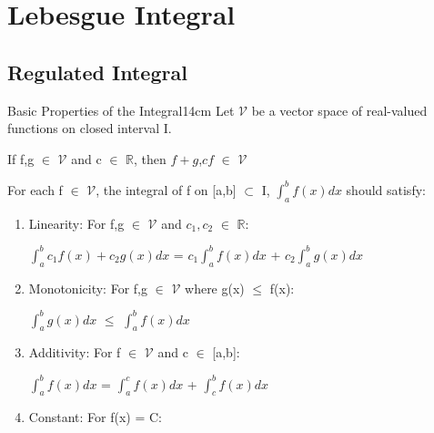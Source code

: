 \newpage

\section[Day 17: Lebesgue Integral]{ Lebesgue Integral }

\subsection{ Regulated Integral }

    \begin{definition}{Basic Properties of the Integral}{14cm}
        Let $\mathcal{V}$ be a vector space of real-valued functions
        on closed interval I.

        \hspace{0.5cm}
        If f,g $\in$ $\mathcal{V}$ and c $\in$ $\mathbb{R}$,
        then $f+g$,$cf$ $\in$ $\mathcal{V}$

        For each f $\in$ $\mathcal{V}$,
        the integral of f on [a,b] $\subset$ I, $\int_a^b f(x) dx$
        should satisfy:

        \begin{enumerate}[label=(\alph*), leftmargin=1cm, itemsep=0.1cm]
            \item {\color{lblue} Linearity}:
                For f,g $\in$ $\mathcal{V}$ and $c_1,c_2$ $\in$ $\mathbb{R}$:
            
                \hspace{0.5cm}
                $\int_a^b c_1f(x) + c_2g(x) dx$
                = $c_1 \int_a^b f(x) dx$ + $c_2 \int_a^b g(x) dx$

            \item {\color{lblue} Monotonicity}:
                For f,g $\in$ $\mathcal{V}$ where g(x) $\leq$ f(x):
            
                \hspace{0.5cm}
                $\int_a^b g(x) dx$ $\leq$ $\int_a^b f(x) dx$

            \item {\color{lblue} Additivity}:
                For f $\in$ $\mathcal{V}$ and c $\in$ [a,b]:
            
                \hspace{0.5cm}
                $\int_a^b f(x) dx$
                = $\int_a^c f(x) dx$ + $\int_c^b f(x) dx$

            \item {\color{lblue} Constant}:
                For f(x) = C:
            

\end{enumerate}
\end{definition}

